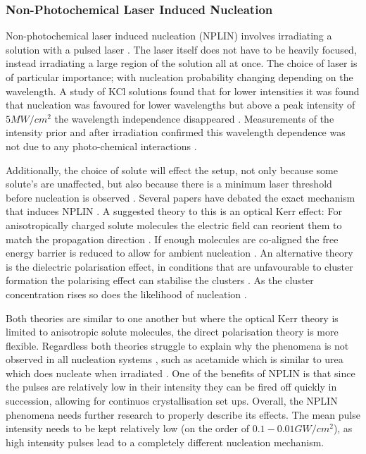 \subsubsection{Non-Photochemical Laser Induced Nucleation}
Non-photochemical laser induced nucleation (NPLIN) involves 
irradiating a solution with a pulsed laser \cite{Garetz1996,
Garetz2002,Sun2006}. The laser itself does not have to be 
heavily focused, instead irradiating a large region of the 
solution all at once. The choice of laser is of particular 
importance; with nucleation probability changing depending 
on the wavelength. A study of KCl solutions found that for 
lower intensities it was found that nucleation was favoured 
for lower wavelengths but above a peak intensity of $5 MW/
cm^2$ the wavelength independence disappeared \cite{Kacker2017}. 
Measurements of the intensity prior and after irradiation 
confirmed this wavelength dependence was not due to any 
photo-chemical interactions \cite{Kacker2017}.

Additionally, the choice of solute will effect the setup, not 
only because some solute's are unaffected, but also because 
there is a minimum laser threshold before nucleation is observed 
\cite{Garetz2002}. Several papers have debated the exact mechanism 
that induces NPLIN \cite{Garetz2002, Knott2011}. A suggested 
theory to this is an optical Kerr effect: For anisotropically 
charged solute molecules the electric field can reorient them 
to match the propagation direction \cite{Garetz2002}. If enough 
molecules are co-aligned the free energy barrier is reduced to 
allow for ambient nucleation \cite{Knott2011}. An alternative 
theory is the dielectric polarisation effect, in conditions that 
are unfavourable to cluster formation the polarising effect can 
stabilise the clusters \cite{Alexander2008}. As the cluster 
concentration rises so does the likelihood of nucleation 
\cite{Vekilov2010}. 

Both theories are similar to one another but where the optical 
Kerr theory is limited to anisotropic solute molecules, the 
direct polarisation theory is more flexible. Regardless both 
theories struggle to explain why the phenomena is not observed 
in all nucleation systems \cite{Korede2023}, such as acetamide 
which is similar to urea which does nucleate when irradiated 
\cite{Ward2016}. One of the benefits of NPLIN is that since the 
pulses are relatively low in their intensity they can be fired 
off quickly in succession, allowing for continuos crystallisation 
set ups. Overall, the NPLIN phenomena needs further research to 
properly describe its effects. The mean pulse intensity needs to 
be kept relatively low (on the order of $0.1-0.01 GW/cm^2$), as 
high intensity pulses lead to a completely different nucleation 
mechanism.

